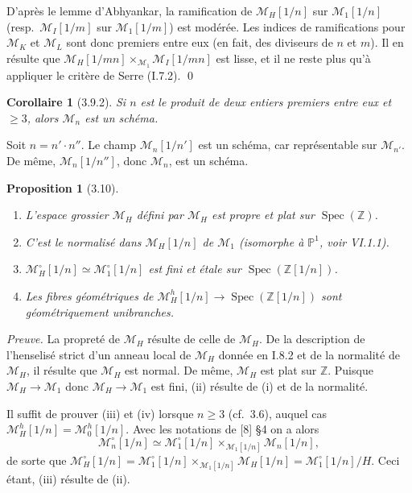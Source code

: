 \documentclass[11pt,a4paper]{amsart}
\theoremstyle{plain}
\newtheorem{proposition}[theorem]{Proposition}
\newtheorem{corollary}[theorem]{Corollaire}
\theoremstyle{definition}
\DeclareMathOperator{\Spec}{Spec}
\newcommand{\CM}{\mathcal{M}}
\newcommand{\mll}{\mathcal{M}}
\newcommand{\ZZ}{\mathbb{Z}}
\newcommand{\PP}{\mathbb{P}}
\begin{document}
D'apr\`es le lemme d'Abhyankar, la ramification de $\mll_H[1/n]$ sur $\mll_1[1/n]$ (resp.\ $\mll_I[1/m]$ sur $\mll_1[1/m]$) est mod\'er\'ee. Les indices de ramifications pour $\mll_K$ et $\mll_L$ sont donc premiers entre eux (en fait, des diviseurs de $n$ et $m$). Il en r\'esulte que $\mll_H[1/mn] \times_{\mll_1} \mll_I[1/mn]$ est lisse, et il ne reste plus qu'\`a appliquer le crit\`ere de Serre (I.7.2).
\qed

\begin{corollary}[3.9.2]
Si $n$ est le produit de deux entiers premiers entre eux et $\geq 3$, alors $\CM_n$ est un sch\'ema.
\end{corollary}

Soit $n = n' \cdot n''$. Le champ $\mll_n[1/n']$ est un sch\'ema, car repr\'esentable sur $\mll_{n'}$. De m\^eme, $\mll_n[1/n'']$, donc $\mll_n$, est un sch\'ema.

\begin{proposition}[3.10] \ \begin{enumerate}[label=(\roman*)]
\item L'espace grossier $\CM_H$ d\'efini par $\mll_H$ est propre et plat sur $\Spec(\ZZ)$.
\item C'est le normalis\'e dans $\mll_H[1/n]$ de $\CM_1$ (isomorphe \`a $\PP^1$, voir VI.1.1).
\item $\mll^{\circ}_H[1/n] \simeq \mll^{\circ}_1[1/n]$ est fini et \'etale sur $\Spec(\ZZ[1/n])$.
\item Les fibres g\'eom\'etriques de $\mll^h_H[1/n] \to \Spec(\ZZ[1/n])$ sont g\'eom\'etriquement unibranches.
\end{enumerate}
\end{proposition}

\noindent\textit{Preuve.} La propret\'e de $\CM_H$ r\'esulte de celle de $\mll_H$. De la description de l'henselis\'e strict d'un anneau local de $\CM_H$ donn\'ee en I.8.2 et de la normalit\'e de $\CM_H$, il r\'esulte que $\CM_H$ est normal. De m\^eme, $\CM_H$ est plat sur $\ZZ$. Puisque $\mll_H \to \mll_1$ donc $\CM_H \to \CM_1$ est fini, (ii) r\'esulte de (i) et de la normalit\'e.

Il suffit de prouver (iii) et (iv) lorsque $n \geq 3$ (cf.~3.6), auquel cas $\mll^h_H[1/n] = \mll^h_0[1/n]$. Avec les notations de [8] \S 4 on a alors
\[
\mll^{\circ}_n[1/n] \simeq \mll^{\circ}_1[1/n] \times_{\mll_1[1/n]} \mll_n[1/n],
\]
de sorte que $\mll^{\circ}_H[1/n] = \mll^{\circ}_1[1/n] \times_{\mll_1[1/n]} \mll_H[1/n] = \mll^{\circ}_1[1/n] / H$. Ceci \'etant, (iii) r\'esulte de (ii).
\end{document}
